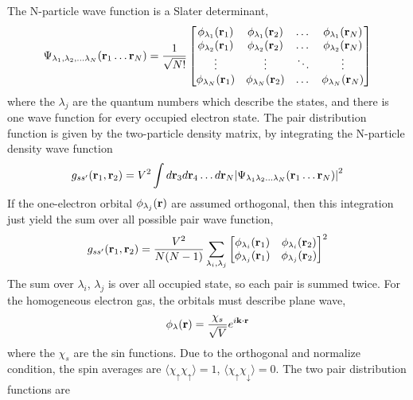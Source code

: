 The N-particle wave function is a Slater determinant,
\begin{equation}
    \Psi_{\lambda_1,\lambda_2,\dots \lambda_N}(\mathbf{r}_1 \dots \mathbf{r}_N) = \frac{1}{\sqrt{N!}}
    \begin{bmatrix}
        \phi_{\lambda_1}(\mathbf{r}_1) & \phi_{\lambda_1}(\mathbf{r}_2) & \dots & \phi_{\lambda_1}(\mathbf{r}_N) \\
        \phi_{\lambda_2}(\mathbf{r}_1) & \phi_{\lambda_2}(\mathbf{r}_2) & \dots & \phi_{\lambda_2}(\mathbf{r}_N) \\
        \vdots & \vdots & \ddots & \vdots \\
        \phi_{\lambda_N}(\mathbf{r}_1) & \phi_{\lambda_N}(\mathbf{r}_2) & \dots & \phi_{\lambda_N}(\mathbf{r}_N)
    \end{bmatrix} \label{5.62}
\end{equation}
where the $\lambda_j$ are the quantum numbers which describe the states, and there is one wave function for every occupied electron state.
The pair distribution function is given by the two-particle density matrix, by integrating the N-particle density wave function
\begin{equation}
    g_{ss'}(\mathbf{r}_1,\mathbf{r}_2) = V^2 \int d\mathbf{r}_3 d\mathbf{r}_4 \dots d \mathbf{r}_N \abs{\Psi_{\lambda_1 \lambda_2 \dots \lambda_N}(\mathbf{r}_1 \dots \mathbf{r}_N) }^2 \label{5.63}
\end{equation}
If the one-electron orbital $\phi_{\lambda_j}(\mathbf{r})$ are assumed orthogonal, then this integration just yield the sum over all possible pair wave function,
\begin{equation}
    g_{ss'}(\mathbf{r}_1 ,\mathbf{r}_2) = \frac{V^2}{N(N-1)} \sum_{\lambda_i,\lambda_j}
    \begin{bmatrix}
        \phi_{\lambda_i}(\mathbf{r}_1) & \phi_{\lambda_i}(\mathbf{r}_2) \\
        \phi_{\lambda_j}(\mathbf{r}_1) & \phi_{\lambda_j}(\mathbf{r}_2)
    \end{bmatrix}^2
    \label{5.64}
\end{equation}
The sum over $\lambda_i$, $\lambda_j$ is over all occupied state, so each pair is summed twice.
For the homogeneous electron gas, the orbitals must describe plane wave,
\begin{equation}
    \phi_\lambda(\mathbf{r}) = \frac{\chi_s}{\sqrt{V}} e^{i\mathbf{k}\cdot\mathbf{r}}    \label{5.65}
\end{equation}
where the $\chi_s$ are the sin functions.
Due to the orthogonal and normalize condition, the spin averages are $\langle \chi_\uparrow \chi_\uparrow \rangle =1$, $\langle \chi_\uparrow \chi_\downarrow \rangle =0$.
The two pair distribution functions are
